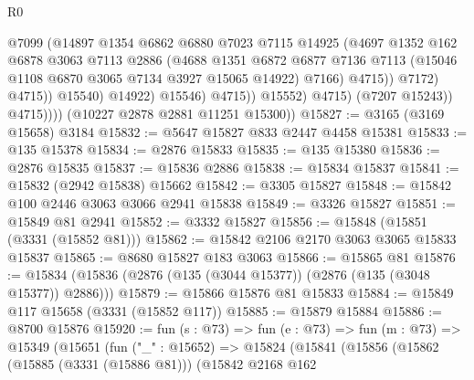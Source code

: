 \begin{lexlean}{R0}
\begin{coremodule}
                                    @7099
                                    (@14897
                                      @1354
                                      @6862
                                      @6880
                                      @7023
                                      @7115
                                      @14925
                                      (@4697
                                        @1352
                                        @162
                                        @6878
                                        @3063
                                        @7113
                                        @2886
                                        (@4688
                                          @1351
                                          @6872
                                          @6877
                                          @7136
                                          @7113
                                          (@15046 @1108 @6870 @3065 @7134 @3927 @15065 @14922)
                                          @7166)
                                        @4715))
                                    @7172)
                                  @4715))
                              @15540)
                            @14922)
                          @15546)
                        @4715))
                    @15552)
                  @4715)
                (@7207 @15243))
              @4715))))
      (@10227 @2878 @2881 @11251 @15300))
@15827 := @3165 (@3169 @15658) @3184
@15832 := @5647 @15827 @833 @2447 @4458 @15381
@15833 := @135 @15378
@15834 := @2876 @15833
@15835 := @135 @15380
@15836 := @2876 @15835
@15837 := @15836 @2886
@15838 := @15834 @15837
@15841 := @15832 (@2942 @15838) @15662
@15842 := @3305 @15827
@15848 := @15842 @100 @2446 @3063 @3066 @2941 @15838
@15849 := @3326 @15827
@15851 := @15849 @81 @2941
@15852 := @3332 @15827
@15856 := @15848 (@15851 (@3331 (@15852 @81)))
@15862 := @15842 @2106 @2170 @3063 @3065 @15833 @15837
@15865 := @8680 @15827 @183 @3063
@15866 := @15865 @81
@15876 := @15834 (@15836 (@2876 (@135 (@3044 @15377)) (@2876 (@135 (@3048 @15377)) @2886)))
@15879 := @15866 @15876 @81 @15833
@15884 := @15849 @117 @15658 (@3331 (@15852 @117))
@15885 := @15879 @15884
@15886 := @8700 @15876
@15920 := fun (s : @73) =>
  fun (e : @73) =>
  fun (m : @73) =>
  @15349
    (@15651
      (fun ("_" : @15652) =>
      @15824
        (@15841
          (@15856
            (@15862
              (@15885 (@3331 (@15886 @81)))
              (@15842
                @2168
                @162

\end{coremodule}
\end{lexlean}
